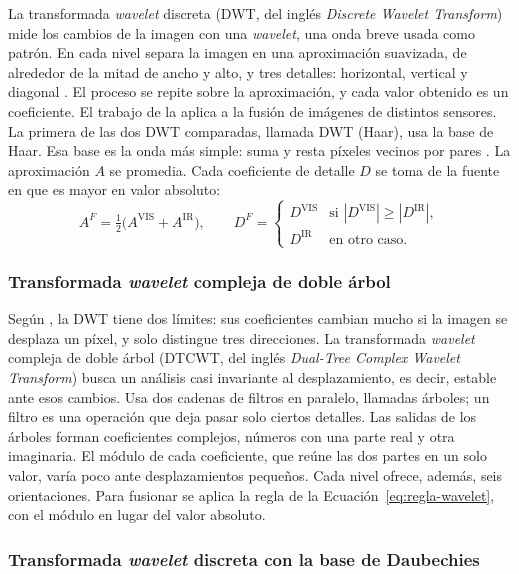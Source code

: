 La transformada \textit{wavelet} discreta (DWT, del inglés \textit{Discrete Wavelet Transform}) mide los
cambios de la imagen con una \textit{wavelet}, una onda breve usada como patrón. En cada nivel separa la
imagen en una aproximación suavizada, de alrededor de la mitad de ancho y alto, y tres detalles:
horizontal, vertical y diagonal \parencite{gonzalez2018}. El proceso se repite sobre la aproximación, y
cada valor obtenido es un coeficiente. El trabajo de \textcite{li1995} la aplica a la fusión de imágenes
de distintos sensores. La primera de las dos DWT comparadas, llamada DWT (Haar), usa la base de Haar. Esa base es la
onda más simple: suma y resta píxeles vecinos por pares \parencite{gonzalez2018}. La aproximación $A$ se
promedia. Cada coeficiente de detalle $D$ se toma de la fuente en que es mayor en valor absoluto:
\begin{equation} A^F=\tfrac{1}{2}\bigl(A^{\mathrm{VIS}}+A^{\mathrm{IR}}\bigr), \qquad D^F=\begin{cases} D^{\mathrm{VIS}} & \text{si } |D^{\mathrm{VIS}}|\geq|D^{\mathrm{IR}}|,\\ D^{\mathrm{IR}} & \text{en otro caso}. \end{cases} \label{eq:regla-wavelet} \end{equation}

\subsubsection{Transformada \textit{wavelet} compleja de doble árbol}

Según \textcite{kingsbury2001}, la DWT tiene dos límites: sus coeficientes cambian mucho si la imagen se
desplaza un píxel, y solo distingue tres direcciones. La transformada \textit{wavelet} compleja de doble
árbol (DTCWT, del inglés \textit{Dual-Tree Complex Wavelet Transform}) busca un análisis casi invariante
al desplazamiento, es decir, estable ante esos cambios. Usa dos cadenas de filtros en paralelo, llamadas
árboles; un filtro es una operación que deja pasar solo ciertos detalles. Las salidas de los
árboles forman coeficientes complejos, números con una parte real y otra imaginaria. El módulo de cada coeficiente, que
reúne las dos partes en un solo valor, varía poco ante desplazamientos pequeños. Cada nivel ofrece,
además, seis orientaciones. Para fusionar se aplica la regla de la Ecuación~\eqref{eq:regla-wavelet},
con el módulo en lugar del valor absoluto.

\subsubsection{Transformada \textit{wavelet} discreta con la base de Daubechies}


